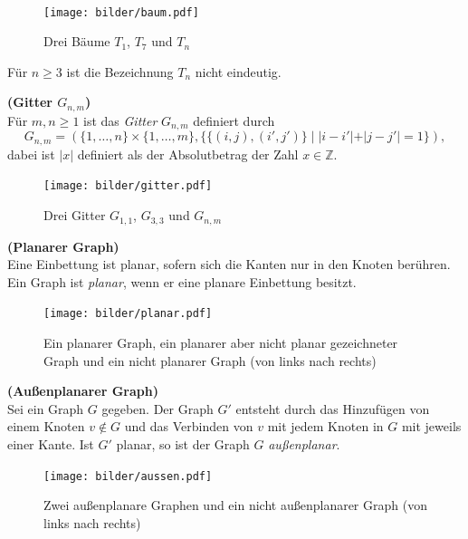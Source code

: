 ~\linebreak
\vspace{-13mm}
\begin{figure}[h!]
		\centering 		 
   \texttt{[image: bilder/baum.pdf]}
	\caption{Drei Bäume $T_{1}$, $T_{7}$ und $T_{n}$}
  	 \end{figure}
  	 \vspace{-4mm}
\begin{bem}
Für $n \geq 3$ ist die Bezeichnung $T_n$ nicht eindeutig.  
\end{bem}
\newpage
\begin{defi}{\textbf{(Gitter $G_{n,m}$)}}\\
Für $m,n \geq 1$ ist das \emph{Gitter} $G_{n,m}$ definiert durch $$G_{n,m}=(\{1,\ldots,n\}\times\{1,\ldots ,m\},\{\{(i,j),(i',j')\}\;|\;|i-i'|+|j-j'|=1\} ),$$ dabei ist $|x|$ definiert als der Absolutbetrag der Zahl $x \in \mathbb{Z}$.\cite{buchwanke} 
\end{defi}
\vspace{-4mm}
\begin{figure}[h!]
		\centering 		 
   \texttt{[image: bilder/gitter.pdf]}
	\caption{Drei Gitter $G_{1,1}$, $G_{3,3}$ und $G_{n,m}$}
  	 \end{figure}

\begin{defi}{\textbf{(Planarer Graph)}}\\
Eine Einbettung ist planar, sofern sich die Kanten nur in den Knoten berühren.\newline
Ein Graph ist \emph{planar}, wenn er eine planare Einbettung besitzt.
\end{defi}

\begin{figure}[h!]
		\centering 		 
   \texttt{[image: bilder/planar.pdf]}
	\caption{Ein planarer Graph, ein planarer aber nicht planar gezeichneter Graph und ein nicht planarer Graph (von links nach rechts)}
  	 \end{figure}


\begin{defi}{\textbf{(Außenplanarer Graph)}}\\
Sei ein Graph $G$ gegeben. Der Graph $G'$ entsteht durch das Hinzufügen von einem Knoten $v \notin G$ und das Verbinden von $v$ mit jedem Knoten in $G$ mit jeweils einer Kante. Ist $G'$ planar, so ist der Graph $G$ \emph{außenplanar}. 
\end{defi}
\begin{figure}[h!]
		\centering 		 
   \texttt{[image: bilder/aussen.pdf]}
	\caption{Zwei außenplanare Graphen und ein nicht außenplanarer Graph (von links nach rechts)}
  	 \end{figure}

